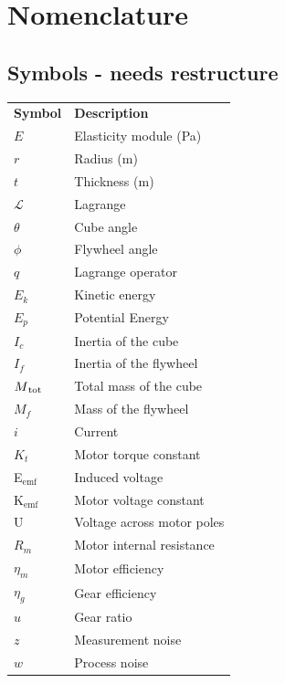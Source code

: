 \documentclass[a4paper,11pt]{kth-mag}
\newcommand{\textunderscript}[1]{$_{\text{#1}}$}
\begin{document}



\cleardoublepage
{}
\printindex
\tableofcontents*

\cleardoublepage
\chapter*{Nomenclature}
\section*{Symbols - needs restructure}
\noindent{}\begin{tabular}{@{}p{2.5cm}l}
\textbf{Symbol} 	& \textbf{Description} \vspace{.5em} \\
$E$ 		& Elasticity module (Pa) \\
$r$		& Radius (m) \\
$t$		& Thickness (m) \\
$\mathcal{L}$			& Lagrange \\
$\theta$		& Cube angle\\
$\phi$		& Flywheel angle \\
$q$			& Lagrange operator \\
$E_k	$		& Kinetic energy \\
$E_p$		& Potential Energy \\
$I_c$		& Inertia of the cube\\
$I_f$		& Inertia of the flywheel\\
$M\textsubscript{tot}$		& Total mass of the cube\\
$M_f$		& Mass of the flywheel \\
$i$			& Current\\
$K_t$		& Motor torque constant\\
E\textunderscript{emf} 	& Induced voltage \\
K\textunderscript{emf} 	& Motor voltage constant \\
U			& Voltage across motor poles\\
$R_m	$		& Motor internal resistance \\
$\eta_m$		& Motor efficiency\\	
$\eta_g$		& Gear efficiency \\
$u$			& Gear ratio\\
$z$			& Measurement noise \\
$w$			& Process noise \\

\end{tabular}
\clearpage
\end{document}
